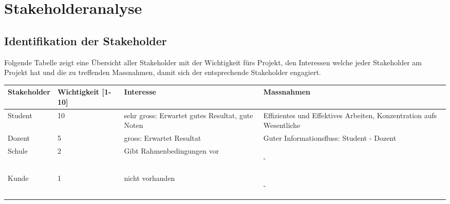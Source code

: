 \chapter{Stakeholderanalyse}
\section{Identifikation der Stakeholder}

Folgende Tabelle zeigt eine \"Ubersicht aller Stakeholder mit der Wichtigkeit f\"urs Projekt, den Interessen welche jeder Stakeholder am Projekt hat und die zu treffenden Massnahmen, damit sich der entsprechende Stakeholder engagiert.\\

\begin{tabular}[h]{| p{3cm} | p{2cm} | p{4cm} | p{4cm} |}
  \hline
  Stakeholder & Wichtigkeit [1-10] & Interesse & Massnahmen\\
  \hline
   Student & 10 & sehr gross: Erwartet gutes Resultat, gute Noten & Effizientes und Effektives Arbeiten, Konzentration aufs Wesentliche\\
   \hline
   Dozent & 5 & gross: Erwartet Resultat & Guter Informationsfluss: Student - Dozent\\
      \hline
   Schule & 2 & Gibt Rahmenbedingungen vor & \begin{center}-\end{center}\\
  \hline
   Kunde & 1 & nicht vorhanden & \begin{center}-\end{center}\\
   \hline
\end{tabular}
